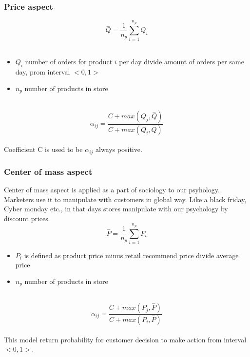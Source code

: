 \subsubsection{Price aspect} \label{subsubsec:model_psychology_price}
\begin{equation} \label{eq:26}
\overset{-}{Q} = \frac{1}{n_p} \sum_{i=1}^{n_p} Q_i
\end{equation}
\\
\begin{itemize}
    \item $Q_i$ number of orders for product $i$ per day divide amount of orders per same day, prom interval $<0,1>$
    \item $n_p$ number of products in store
\end{itemize}
\\
\begin{equation} \label{eq:27}
\alpha_{ij} = \frac{C+max(Q_j, \overset{-}{Q})}{C+max(Q_i, \overset{-}{Q})}
\end{equation}
\\
Coefficient C is used to be $\alpha_{ij}$ always positive.
\subsubsection{Center of mass aspect} \label{subsubsec:model_psychology_mass}
Center of mass aspect is applied as a part of sociology to our psyhology.
Marketers use it to manipulate with customers in global way.
Like a black friday, Cyber monday etc., in that days stores manipulate with our psychology by discount prices.
\\
\begin{equation} \label{eq:28}
\overset{-}{P} = \frac{1}{n_p} \sum_{i=1}^{n_p} P_i
\end{equation}
\begin{itemize}
    \item $P_i$ is defined as product price minus retail recommend price divide average price
    \item $n_p$ number of products in store
\end{itemize}
\\
\begin{equation} \label{eq:29}
\alpha_{ij} = \frac{C+max(P_j, \overset{-}{P})}{C+max(P_i, \overset{-}{P})}
\end{equation}
\\
This model return probability for customer decision to make action from interval $<0,1>$.
\\
